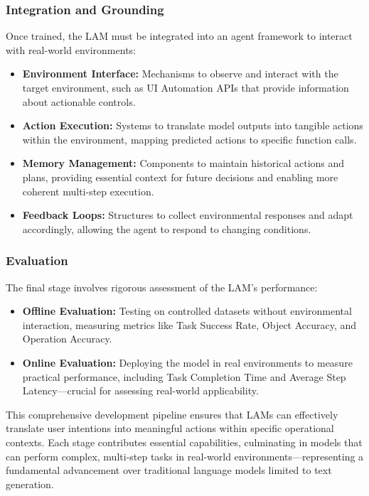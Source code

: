 \documentclass[journal,twoside,10pt]{IEEEtran}
\begin{document}
\subsubsection{Integration and Grounding}
Once trained, the LAM must be integrated into an agent framework to interact with real-world environments:

\begin{itemize}
    \item \textbf{Environment Interface:} Mechanisms to observe and interact with the target environment, such as UI Automation APIs that provide information about actionable controls.
    
    \item \textbf{Action Execution:} Systems to translate model outputs into tangible actions within the environment, mapping predicted actions to specific function calls.
    
    \item \textbf{Memory Management:} Components to maintain historical actions and plans, providing essential context for future decisions and enabling more coherent multi-step execution.
    
    \item \textbf{Feedback Loops:} Structures to collect environmental responses and adapt accordingly, allowing the agent to respond to changing conditions.
\end{itemize}

\subsubsection{Evaluation}
The final stage involves rigorous assessment of the LAM's performance:

\begin{itemize}
    \item \textbf{Offline Evaluation:} Testing on controlled datasets without environmental interaction, measuring metrics like Task Success Rate, Object Accuracy, and Operation Accuracy.
    
    \item \textbf{Online Evaluation:} Deploying the model in real environments to measure practical performance, including Task Completion Time and Average Step Latency—crucial for assessing real-world applicability.
\end{itemize}

This comprehensive development pipeline ensures that LAMs can effectively translate user intentions into meaningful actions within specific operational contexts. Each stage contributes essential capabilities, culminating in models that can perform complex, multi-step tasks in real-world environments—representing a fundamental advancement over traditional language models limited to text generation.
\end{document}
